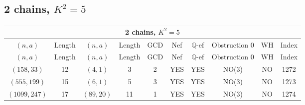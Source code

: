 \subsection{2 chains, $K^2 = 5$}
\begin{longtable}{|c|c|c|c|c|c|c|c|c|c|}
\hline
\multicolumn{10}{|c|}{2 chains, $K^2 = 5$}\\
\hline
$(n,a)$ & Length & $(n,a)$ & Length & GCD & Nef & $\mathbb Q$-ef & Obstruction 0 & WH & Index\\
\hline
\endfirsthead

\hline
$(n,a)$ & Length & $(n,a)$ & Length & GCD & Nef & $\mathbb Q$-ef & Obstruction 0 & WH & Index\\
\hline
\endhead
\hline
\endfoot

$(158, 33)$ & 12 & $(4, 1)$ & 3 & 2 & YES & YES & NO(3) & NO & 1272\\
$(555, 199)$ & 15 & $(6, 1)$ & 5 & 3 & YES & YES & NO(3) & NO & 1273\\
$(1099, 247)$ & 17 & $(89, 20)$ & 11 & 1 & YES & YES & NO(3) & NO & 1274
\end{longtable}
